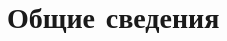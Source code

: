 

\titleformat{\section}{\normalfont\normalsize}{\thesection}{1.0em}{}
\titleformat{\subsection}{\normalfont\normalsize}{\thesubsection}{1.0em}{}

\newpage
\section{Общие сведения}


















\label{lastpage}
